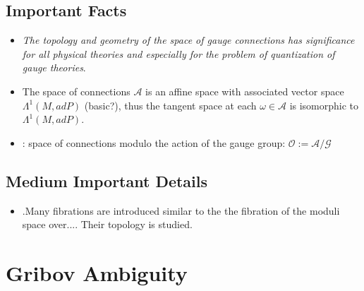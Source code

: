 \subsection{Important Facts}
\begin{itemize}
    \item \emph{The topology and geometry of the space of gauge connections has significance for all physical theories and especially for the problem of quantization of gauge theories}.
    
    \item The space of connections $\mathcal A$ is an affine space with associated vector space $\Lambda^1(M, ad P)$ (basic?), thus the tangent space at each $\omega \in \mathcal A$ is isomorphic to $\Lambda^1(M, ad P)$.
    
    \item {}: space of connections modulo the action of the gauge group: $\mathcal O := \mathcal{A/G}$
    
    
\end{itemize}

\subsection{Medium Important Details}
\begin{itemize}
    \item .Many fibrations are introduced similar to the the fibration of the moduli space over.... Their topology is studied.
\end{itemize}

\section{Gribov Ambiguity}

